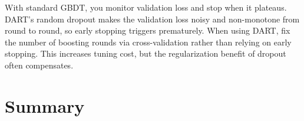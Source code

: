 \begin{warning}
With standard GBDT, you monitor validation loss and stop when it plateaus.
DART's random dropout makes the validation loss noisy and non-monotone from
round to round, so early stopping triggers prematurely.  When using DART,
fix the number of boosting rounds via cross-validation rather than relying
on early stopping.  This increases tuning cost, but the regularization
benefit of dropout often compensates.
\end{warning}


\section{Summary}\label{sec:trees:summary}

